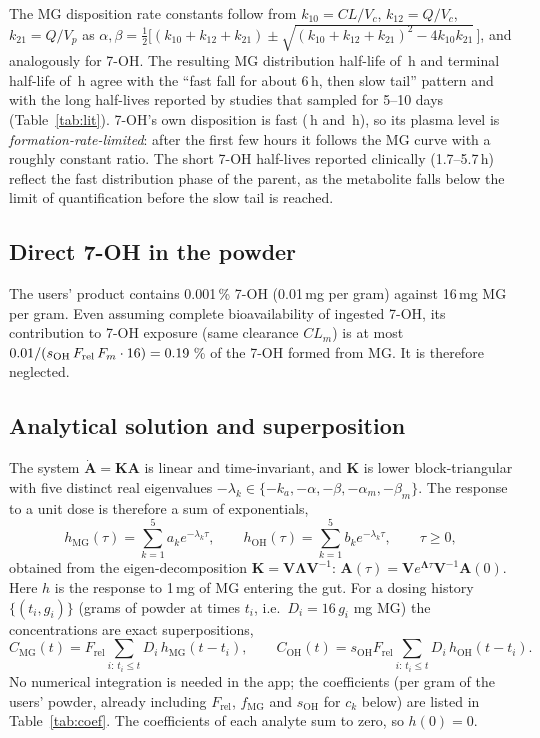 \documentclass[10pt,a4paper]{article}
\newcommand{\MG}{\mathrm{MG}}
\newcommand{\OH}{\mathrm{OH}}
\begin{document}
The MG disposition rate constants follow from $k_{10}=CL/V_c$, $k_{12}=Q/V_c$, $k_{21}=Q/V_p$ as
$\alpha,\beta = \tfrac12\big[(k_{10}+k_{12}+k_{21}) \pm \sqrt{(k_{10}+k_{12}+k_{21})^2-4k_{10}k_{21}}\,\big]$,
and analogously for 7-OH. The resulting MG distribution half-life of \ntalpha\,h and terminal half-life of \ntbeta\,h
agree with the ``fast fall for about 6\,h, then slow tail'' pattern and with the long half-lives reported by studies
that sampled for 5--10 days (Table~\ref{tab:lit}). 7-OH's own disposition is fast (\ntmalpha\,h and \ntmbeta\,h),
so its plasma level is \emph{formation-rate-limited}: after the first few hours it follows the MG curve with a roughly constant ratio.
The short 7-OH half-lives reported clinically (1.7--5.7\,h) reflect the fast distribution phase of the parent, as the
metabolite falls below the limit of quantification before the slow tail is reached.

\subsection{Direct 7-OH in the powder}
The users' product contains 0.001\,\% 7-OH (0.01\,mg per gram) against 16\,mg MG per gram. Even assuming complete bioavailability
of ingested 7-OH, its contribution to 7-OH exposure (same clearance $CL_m$) is at most
$0.01/(s_{\OH}\,F_{\mathrm{rel}}\,F_m\cdot 16)=\ndirectOH$\,\% of the 7-OH formed from MG. It is therefore neglected.

\subsection{Analytical solution and superposition}
The system $\dot{\mathbf A}=\mathbf K\mathbf A$ is linear and time-invariant, and $\mathbf K$ is lower block-triangular with
five distinct real eigenvalues $-\lambda_k \in \{-k_a,-\alpha,-\beta,-\alpha_m,-\beta_m\}$. The response to a unit
dose is therefore a sum of exponentials,
\begin{equation}
h_{\MG}(\tau)=\sum_{k=1}^{5} a_k e^{-\lambda_k\tau},\qquad h_{\OH}(\tau)=\sum_{k=1}^{5} b_k e^{-\lambda_k\tau},\qquad \tau\ge 0,
\end{equation}
obtained from the eigen-decomposition $\mathbf K=\mathbf V\boldsymbol\Lambda\mathbf V^{-1}$:
$\mathbf A(\tau)=\mathbf V e^{\boldsymbol\Lambda\tau}\mathbf V^{-1}\mathbf A(0)$. Here $h$ is the response to 1\,mg of MG entering the gut. For a dosing history $\{(t_i,g_i)\}$
(grams of powder at times $t_i$, i.e.\ $D_i=16\,g_i$ mg MG) the concentrations are exact superpositions,
\begin{equation}
C_{\MG}(t)=F_{\mathrm{rel}}\!\sum_{i:\,t_i\le t} D_i\, h_{\MG}(t-t_i),\qquad C_{\OH}(t)=s_{\OH}F_{\mathrm{rel}}\!\sum_{i:\,t_i\le t} D_i\, h_{\OH}(t-t_i).
\label{eq:super}
\end{equation}
No numerical integration is needed in the app; the coefficients (per gram of the users' powder, already including
$F_{\mathrm{rel}}$, $f_{\MG}$ and $s_{\OH}$ for $c_k$ below) are listed in Table~\ref{tab:coef}. The coefficients of each analyte sum to
zero, so $h(0)=0$.
\end{document}
